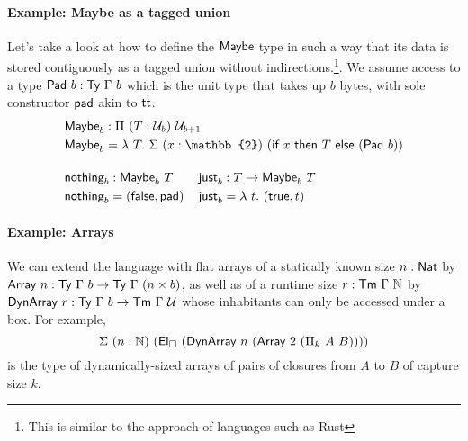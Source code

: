 \paragraph{Example: Maybe as a tagged union}\label{maybe-as-a-tagged-union}

Let's take a look at how to define the \(\textsf{Maybe}\) type in
such a way that its data is stored contiguously as a tagged union without indirections.\footnote{This
is similar to the approach of languages such as Rust}.
We assume access to a type $\textsf{Pad}\ b : \textsf{Ty}\ \Gamma\ b$ which is the unit type that takes up $b$ bytes, with sole constructor $\textsf{pad}$ akin to $\textsf{tt}$.
\[
\begin{aligned}
&\syn{Maybe}_b : \Pi\ (T : \univ_b)\ \univ_{b + 1} \\
&\syn{Maybe}_b = \lambda\ T.\ \Sigma\ (x : \mathbb{2})\ (\syn{if}\ x\ \syn{then}\ T\ \syn{else}\ (\syn{Pad}\ b)) \\[1em]
&\begin{alignedat}{2}
&\syn{nothing}_b : \syn{Maybe}_b\ T  \qquad && \syn{just}_b : T \to \syn{Maybe}_b\ T \\
&\syn{nothing}_b = (\syn{false}, \syn{pad}) && \syn{just}_b = \lambda\ t.\  (\syn{true}, t)
\end{alignedat}
\end{aligned}
\]

\paragraph{Example: Arrays}\label{arrays}

We can extend the language with flat arrays of a statically known size $n : \textsf{Nat}$ by
$\textsf{Array}\ n : \textsf{Ty}\ \Gamma\ b \to \textsf{Ty}\ \Gamma\ (n \times b)$, as well
as of a runtime size $r : \textsf{Tm}\ \Gamma\ \mathbb{N}$ by $\syn{DynArray}\ r : \Ty\ \Gamma\ b \to \Tm\ \Gamma\ \univ$
whose inhabitants can only be accessed under a box. For example,
\[
\Sigma\ (n : \mathbb{N})\ (\El_\square\ (\syn{DynArray}\ n\ (\syn{Array}\ 2\ (\Pi_k\ A\ B))))
\]
is the type of dynamically-sized arrays of pairs of closures from $A$ to $B$ of capture size $k$.
